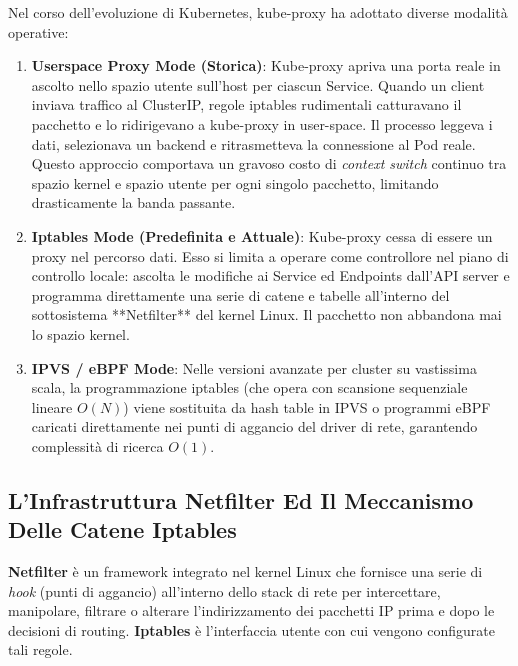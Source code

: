 \documentclass[11pt, a4paper]{article}
\begin{document}
Nel corso dell'evoluzione di Kubernetes, kube-proxy ha adottato diverse modalità operative:
\begin{enumerate}[noitemsep]
    \item \textbf{Userspace Proxy Mode (Storica)}: Kube-proxy apriva una porta reale in ascolto nello spazio utente sull'host per ciascun Service. Quando un client inviava traffico al ClusterIP, regole iptables rudimentali catturavano il pacchetto e lo ridirigevano a kube-proxy in user-space. Il processo leggeva i dati, selezionava un backend e ritrasmetteva la connessione al Pod reale. Questo approccio comportava un gravoso costo di \emph{context switch} continuo tra spazio kernel e spazio utente per ogni singolo pacchetto, limitando drasticamente la banda passante.
    \item \textbf{Iptables Mode (Predefinita e Attuale)}: Kube-proxy cessa di essere un proxy nel percorso dati. Esso si limita a operare come controllore nel piano di controllo locale: ascolta le modifiche ai Service ed Endpoints dall'API server e programma direttamente una serie di catene e tabelle all'interno del sottosistema **Netfilter** del kernel Linux. Il pacchetto non abbandona mai lo spazio kernel.
    \item \textbf{IPVS / eBPF Mode}: Nelle versioni avanzate per cluster su vastissima scala, la programmazione iptables (che opera con scansione sequenziale lineare $O(N)$) viene sostituita da hash table in IPVS o programmi eBPF caricati direttamente nei punti di aggancio del driver di rete, garantendo complessità di ricerca $O(1)$.
\end{enumerate}

\subsection{L'Infrastruttura Netfilter Ed Il Meccanismo Delle Catene Iptables}
\textbf{Netfilter} è un framework integrato nel kernel Linux che fornisce una serie di \emph{hook} (punti di aggancio) all'interno dello stack di rete per intercettare, manipolare, filtrare o alterare l'indirizzamento dei pacchetti IP prima e dopo le decisioni di routing. \textbf{Iptables} è l'interfaccia utente con cui vengono configurate tali regole.
\end{document}
